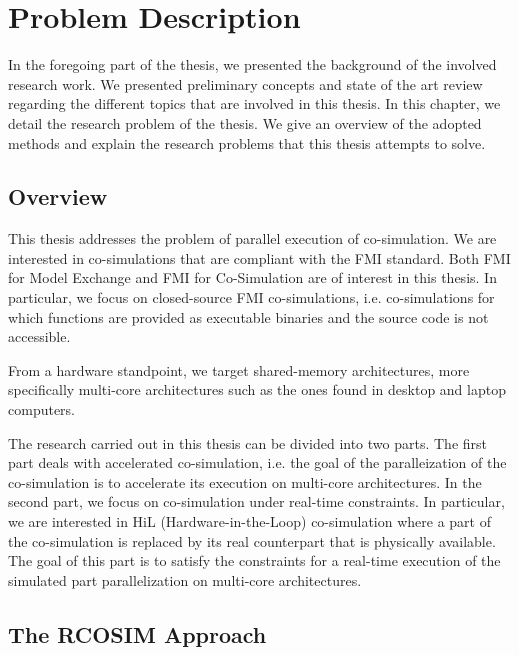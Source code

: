 \chapter{\label{ch:3-state}Problem Description} 

\minitoc

In the foregoing part of the thesis, we presented the background of the involved research work. We presented preliminary concepts and state of the art review regarding the different topics that are involved in this thesis. In this chapter, we detail the research problem of the thesis. We give an overview of the adopted methods and explain the research problems that this thesis attempts to solve.

\section{Overview}

This thesis addresses the problem of parallel execution of co-simulation. We are interested in co-simulations that are compliant with the FMI standard. Both FMI for Model Exchange and FMI for Co-Simulation are of interest in this thesis. In particular, we focus on closed-source FMI co-simulations, i.e. co-simulations for which functions are provided as executable binaries and the source code is not accessible.

From a hardware standpoint, we target shared-memory architectures, more specifically multi-core architectures such as the ones found in desktop and laptop computers.

The research carried out in this thesis can be divided into two parts. The first part deals with accelerated co-simulation, i.e. the goal of the paralleization of the co-simulation is to accelerate its execution on multi-core architectures. In the second part, we focus on co-simulation under real-time constraints. In particular, we are interested in HiL (Hardware-in-the-Loop) co-simulation where a part of the co-simulation is replaced by its real counterpart that is physically available. 
The goal of this part is to satisfy the constraints for a real-time execution of the simulated part parallelization on multi-core architectures.

\section{The RCOSIM Approach}

